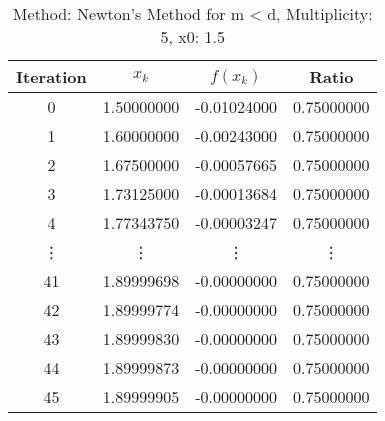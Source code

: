 \begin{table}
\centering
\caption{Method: Newton's Method for m < d, Multiplicity: 5, x0: 1.5}
\label{tab:table_Newton's_Method_for_m_<_d_5_1_5}
\begin{tabular}{c c c c}
\toprule
Iteration &      $x_k$ &    $f(x_k)$ &      Ratio \\
\midrule
        0 & 1.50000000 & -0.01024000 & 0.75000000 \\
        1 & 1.60000000 & -0.00243000 & 0.75000000 \\
        2 & 1.67500000 & -0.00057665 & 0.75000000 \\
        3 & 1.73125000 & -0.00013684 & 0.75000000 \\
        4 & 1.77343750 & -0.00003247 & 0.75000000 \\
   \vdots &     \vdots &      \vdots &     \vdots \\
       41 & 1.89999698 & -0.00000000 & 0.75000000 \\
       42 & 1.89999774 & -0.00000000 & 0.75000000 \\
       43 & 1.89999830 & -0.00000000 & 0.75000000 \\
       44 & 1.89999873 & -0.00000000 & 0.75000000 \\
       45 & 1.89999905 & -0.00000000 & 0.75000000 \\
\bottomrule
\end{tabular}
\end{table}
